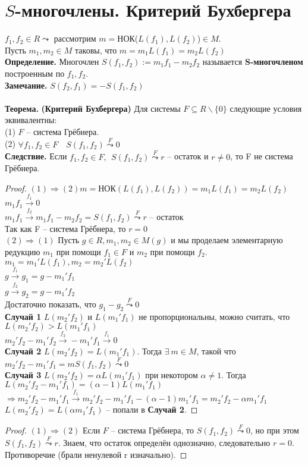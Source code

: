 \section{$S$-многочлены. Критерий Бухбергера}

$f_1,f_2\in R\leadsto $ рассмотрим $m=$НОК($L(f_1),L(f_2)$)$\in M$.\\
Пусть $m_1, m_2\in M$ таковы, что $m=m_1L(f_1)=m_2L(f_2)$\\
\textbf{Определение.} Многочлен $S(f_1,f_2):=m_1f_1-m_2f_2$ называется \textbf{S-многочленом} построенным по $f_1,f_2$.\\
\textbf{Замечание.} $S(f_2,f_1)=-S(f_1,f_2)$\\\\
\textbf{Теорема.} \textbf{(Критерий Бухбергера)} Для системы $F\subseteq R\backslash\{0\}$ следующие условия эквивалентны:\\
\indent (1) $F$ -- система Грёбнера.\\
\indent (2) $\forall f_1,f_2\in F\quad S(f_1,f_2)\overset{F}{\leadsto}0$\\
\textbf{Следствие.} Если $f_1,f_2\in F, \ \ S(f_1,f_2)\overset{F}{\leadsto}r$ -- остаток и $r\neq 0$, то F не система Грёбнера.\\
\begin{proof}
    $(1)\Rightarrow (2) m=$НОК$(L(f_1),L(f_2))=m_1L(f_1)=m_2L(f_2)$\\
    $m_1f_1\overset{f_1}{\to}0$\\
    $m_1f_1\overset{f_2}{\to}m_1f_1-m_2f_2=S(f_1,f_2)\overset{F}{\leadsto}r$ -- остаток\\
    Так как F -- система Грёбнера, то $r=0$\\
    $(2)\Rightarrow (1)$ Пусть $g\in R, m_1,m_2\in M(g)$ и мы проделаем элементарную редукцию $m_1$ при помощи $f_1\in F$ и $m_2$ при помощи $f_2$.\\
    $m_1=m_1'L(f_1), m_2=m_2'L(f_2)$\\
    $g\overset{f_1}{\to}g_1=g-m_1'f_1$\\
    $g\overset{f_2}{\to}g_2=g-m_1'f_2$\\
    Достаточно показать, что $g_1-g_2\overset{F}{\leadsto}0$\\
    \textbf{Случай 1} $L(m_2'f_2)$ и $L(m_1'f_1)$ не пропорциональны, можно считать, что $L(m_2'f_2)>L(m_1'f_1)$\\
    $m_2'f_2-m_1'f_2\overset{f_2}{\to}-m_1'f_1\overset{f_1}{\to}0$\\
    \textbf{Случай 2} $L(m_2'f_2)=L(m_1'f_1)$. Тогда $\exists \ m\in M$, такой что $m_2'f_2-m_1'f_1=mS(f_1,f_2)\overset{F}{\leadsto}0$\\
    \textbf{Случай 3} $L(m_2'f_2)=\alpha L(m_1'f_1)$ при некотором $\alpha\neq 1$. Тогда $L(m_2'f_2-m_1'f_1)=(\alpha - 1)L(m_1'f_1)$\\
    $\Rightarrow m_2'f_2-m_1'f_1\overset{f_1}{\to}m_2'f_2-m_1'f_1-(\alpha - 1)m_1'f_1=m_2'f_2-\alpha m_1'f_1$\\
    $L(m_2'f_2)=L(\alpha m_1'f_1)$ -- попали в \textbf{Случай 2}.
\end{proof}
\begin{proof}
    $(1) \Rightarrow (2)$ Если $F$ -- система Грёбнера, то $S(f_1,f_2)\overset{F}{\leadsto}0$, но при этом\\ $S(f_1,f_2)\overset{F}{\leadsto}r$. Знаем, что остаток определён однозначно, следовательно $r=0$. Противоречие (брали ненулевой r изначально).
\end{proof}